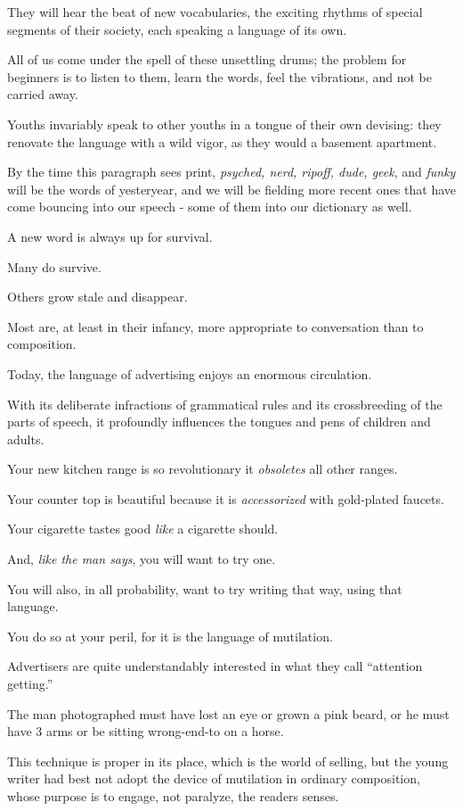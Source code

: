 \documentclass{book}
\numberwithin{equation}{section}
\begin{document}
They will hear the beat of new vocabularies, the exciting rhythms of special segments of their society, each speaking a language of its own.

All of us come under the spell of these unsettling drums; the problem for beginners is to listen to them, learn the words, feel the vibrations, and not be carried away.

%
Youths invariably speak to other youths in a tongue of their own devising: they renovate the language with a wild vigor, as they would a basement apartment.

By the time this paragraph sees print, \textit{psyched, nerd, ripoff, dude, geek}, and \textit{funky} will be the words of yesteryear, and we will be fielding more recent ones that have come bouncing into our speech - some of them into our dictionary as well.

A new word is always up for survival.

Many do survive.

Others grow stale and disappear.

Most are, at least in their infancy, more appropriate to conversation than to composition.

%
Today, the language of advertising enjoys an enormous circulation.

With its deliberate infractions of grammatical rules and its crossbreeding of the parts of speech, it profoundly influences the tongues and pens of children and adults.

Your new kitchen range is so revolutionary it \textit{obsoletes} all other ranges.

Your counter top is beautiful because it is \textit{accessorized} with gold-plated faucets.

Your cigarette tastes good \textit{like} a cigarette should.

And, \textit{like the man says}, you will want to try one.

You will also, in all probability, want to try writing that way, using that language.

You do so at your peril, for it is the language of mutilation.

%
Advertisers are quite understandably interested in what they call ``attention getting.''

The man photographed must have lost an eye or grown a pink beard, or he must have 3 arms or be sitting wrong-end-to on a horse.

This technique is proper in its place, which is the world of selling, but the young writer had best not adopt the device of mutilation in ordinary composition, whose purpose is to engage, not paralyze, the readers senses.
\end{document}

